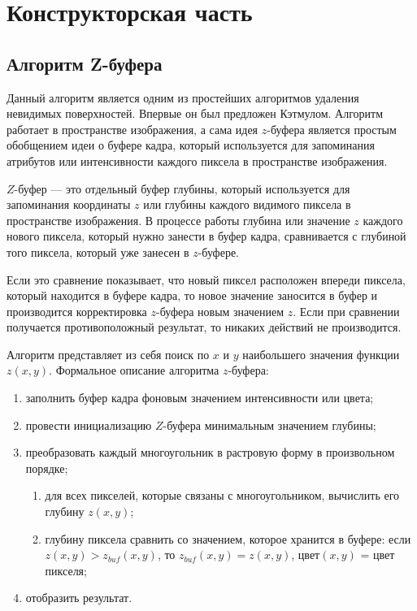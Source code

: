 \chapter{Конструкторская часть}

\section{Алгоритм Z-буфера}

Данный алгоритм является одним из простейших алгоритмов удаления невидимых поверхностей. Впервые он был предложен Кэтмулом. Алгоритм работает в пространстве изображения, а сама идея $z$-буфера является простым обобщением идеи о буфере кадра, который используется для запоминания атрибутов или интенсивности каждого пиксела в пространстве изображения.

$Z$-буфер --- это отдельный буфер глубины, который используется для запоминания координаты $z$ или глубины каждого видимого пиксела в пространстве изображения. В процессе работы глубина или значение $z$ каждого нового пиксела, который нужно занести в буфер кадра, сравнивается с глубиной того пиксела, который уже занесен в $z$-буфере.

Если это сравнение показывает, что новый пиксел расположен впереди пиксела, который находится в буфере кадра, то новое значение заносится в буфер и производится корректировка $z$-буфера новым значением $z$. Если при сравнении получается противоположный результат, то никаких действий не производится.

Алгоритм представляет из себя поиск по $x$ и $y$ наибольшего значения функции $z(x, y)$. Формальное описание алгоритма $z$-буфера:

\begin{enumerate}[label=\arabic*)]
	\item заполнить буфер кадра фоновым значением интенсивности или цвета;
	\item провести инициализацию $Z$-буфера минимальным значением глубины;
	\item преобразовать каждый многоугольник в растровую форму в произвольном порядке;
	\begin{enumerate}
		\item для всех пикселей, которые связаны с многоугольником, вычислить его глубину $z(x, y)$;
		\item глубину пиксела сравнить со значением, которое хранится в буфере: если $z(x, y) > z_{buf}(x, y)$, то $z_{buf}(x, y) = z(x, y)$, цвет$(x, y)$ = цвет пикселя;
	\end{enumerate}
	\item отобразить результат.
\end{enumerate}


